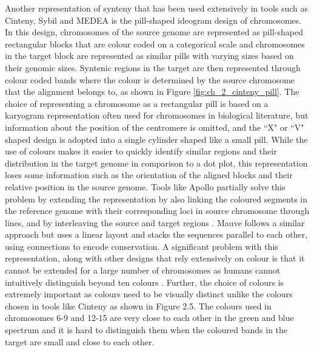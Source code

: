 Another representation of synteny that has been used extensively in tools such as Cinteny\cite{sinha2007cinteny}, Sybil\cite{crabtree2007sybil} and MEDEA\cite{nusrat2019tasks} is the pill-shaped ideogram design of chromosomes. In this design, chromosomes of the source genome are represented as pill-shaped rectangular blocks that are colour coded on a categorical scale and chromosomes in the target block are represented as similar pills with varying sizes based on their genomic sizes. Syntenic regions in the target are then represented through colour coded bands where the colour is determined by the source chromosome that the alignment belongs to, as shown in Figure \ref{fig:ch_2_cinteny_pill}.
The choice of representing a chromosome as a rectangular pill is based on a karyogram representation often used for chromosomes in biological literature\cite{pearson1973uniqueness}, but information about the position of the centromere is omitted, and the ``X" or ``V" shaped design is adopted into a single cylinder shaped like a small pill. While the use of colours makes it easier to quickly identify similar regions and their distribution in the target genome in comparison to a dot plot, this representation loses some information such as the orientation of the aligned blocks and their relative position in the source genome. Tools like Apollo partially solve this problem by extending the representation by also linking the coloured segments in the reference genome with their corresponding loci in source chromosome through lines, and by interleaving the source and target regions \cite{lee2009apollo}. Mauve follows a similar approach but uses a linear layout and stacks the sequences parallel to each other, using connections to encode conservation\cite{darling2004mauve}. A significant problem with this representation, along with other designs that rely extensively on colour is that it cannot be extended for a large number of chromosomes as humans cannot intuitively distinguish beyond ten colours \cite{tufte1990envisioning}. Further, the choice of colours is extremely important as colours need to be visually distinct unlike the colours chosen in tools like Cinteny\cite{sinha2007cinteny} as shown in Figure 2.5. The colours used in chromosomes 6-9 and 12-15 are very close to each other in the green and blue spectrum and it is hard to distinguish them when the coloured bands in the target are small and close to each other. 


